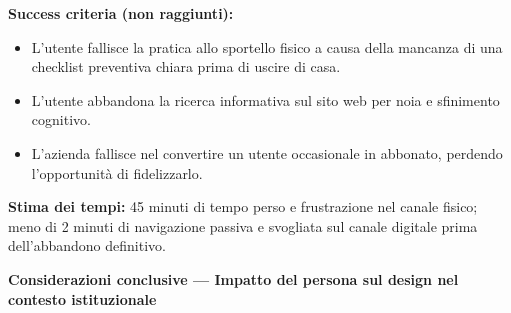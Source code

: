 \documentclass[11pt,a4paper]{article}
\begin{document}
\begin{tcolorbox}[colback=backgroundColor,colframe=borderColor,arc=2mm]
{    \textbf{Success criteria (non raggiunti):}
    \begin{itemize}
        \item L'utente fallisce la pratica allo sportello fisico a causa della mancanza di una checklist preventiva chiara prima di uscire di casa.
        \item L'utente abbandona la ricerca informativa sul sito web per noia e sfinimento cognitivo.
        \item L'azienda fallisce nel convertire un utente occasionale in abbonato, perdendo l'opportunità di fidelizzarlo.
    \end{itemize}

    \textbf{Stima dei tempi:} 45 minuti di tempo perso e frustrazione nel canale fisico; meno di 2 minuti di navigazione passiva e svogliata sul canale digitale prima dell'abbandono definitivo.
    }
\end{tcolorbox}

\begin{tcolorbox}[colback=primaryColor!10,colframe=primaryColor,arc=2mm]
    \textbf{Considerazioni conclusive --- Impatto del persona sul design nel contesto istituzionale}
\end{tcolorbox}

\vspace{0.3cm}
\end{document}
